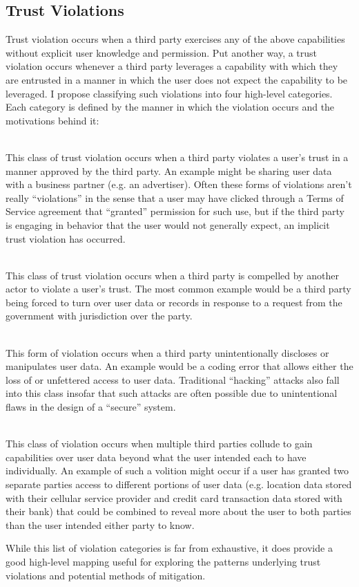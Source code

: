 \subsection{Trust Violations}

Trust violation occurs when a third party exercises any of the above
capabilities without explicit user knowledge and permission. Put
another way, a trust violation occurs whenever a third party leverages
a capability with which they are entrusted in a manner in which the
user does not expect the capability to be leveraged. I propose
classifying such violations into four high-level categories. Each
category is defined by the manner in which the violation occurs and
the motivations behind it:

\begin{packed_desc}
\item[Implicit (P-Violation):] \hfill \\ This class of trust violation
  occurs when a third party violates a user's trust in a manner
  approved by the third party. An example might be sharing user data
  with a business partner (e.g. an advertiser). Often these forms of
  violations aren't really ``violations'' in the sense that a user may
  have clicked through a Terms of Service agreement that ``granted''
  permission for such use, but if the third party is engaging in
  behavior that the user would not generally expect, an implicit trust
  violation has occurred.
\item[Compelled (C-Violation):] \hfill \\ This class of trust
  violation occurs when a third party is compelled by another actor to
  violate a user's trust. The most common example would be a third
  party being forced to turn over user data or records in response to
  a request from the government with jurisdiction over the party.
\item[Unintentional (U-Violation):] \hfill \\ This form of violation
  occurs when a third party unintentionally discloses or manipulates
  user data. An example would be a coding error that allows either the
  loss of or unfettered access to user data. Traditional ``hacking''
  attacks also fall into this class insofar that such attacks are
  often possible due to unintentional flaws in the design of a
  ``secure'' system.
\item[Colluding (L-Violation):] \hfill \\ This class of violation
  occurs when multiple third parties collude to gain capabilities over
  user data beyond what the user intended each to have
  individually. An example of such a volition might occur if a user
  has granted two separate parties access to different portions of
  user data (e.g. location data stored with their cellular service
  provider and credit card transaction data stored with their bank)
  that could be combined to reveal more about the user to both parties
  than the user intended either party to know.
\end{packed_desc}

While this list of violation categories is far from exhaustive, it
does provide a good high-level mapping useful for exploring the
patterns underlying trust violations and potential methods of
mitigation.
